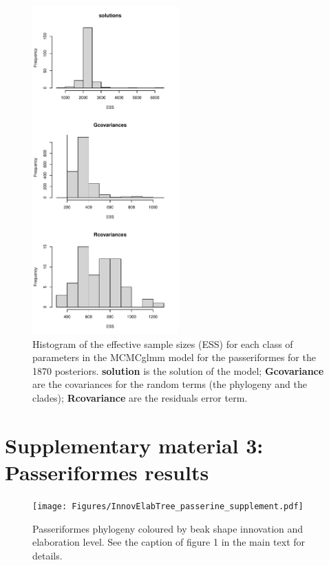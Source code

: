 \documentclass[12pt,letterpaper]{article}
\begin{document}
\begin{figure}[htbp]
\centering
   \includegraphics[width=0.5\textwidth]{Figures/parameters_ESS_passeriformes.pdf}
\caption{Histogram of the effective sample sizes (ESS) for each class of parameters in the MCMCglmm model for the passeriformes for the 1870 posteriors. \textbf{solution} is the solution of the model; \textbf{Gcovariance} are the covariances for the random terms (the phylogeny and the clades); \textbf{Rcovariance} are the residuals error term.}
\label{Fig:model_ess_passeriformes}
\end{figure}


\clearpage
\section{Supplementary material 3: Passeriformes results}

\begin{figure}[!htbp]
\centering
    \texttt{[image: Figures/InnovElabTree\_passerine\_supplement.pdf]}
\caption{Passeriformes phylogeny coloured by beak shape innovation and elaboration level. See the caption of figure 1 in the main text for details.}
\label{fig_phylogeny_passeriformes}
\end{figure}
\end{document}
